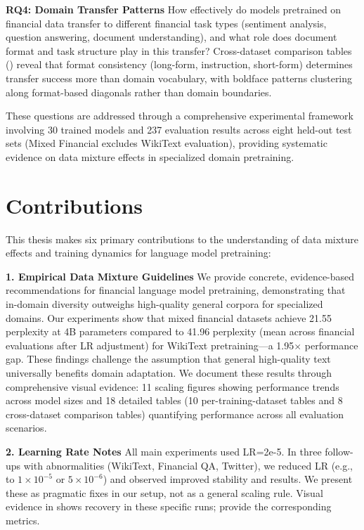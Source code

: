 \textbf{RQ4: Domain Transfer Patterns}
How effectively do models pretrained on financial data transfer to different financial task types (sentiment analysis, question answering, document understanding), and what role does document format and task structure play in this transfer? Cross-dataset comparison tables () reveal that format consistency (long-form, instruction, short-form) determines transfer success more than domain vocabulary, with boldface patterns clustering along format-based diagonals rather than domain boundaries.

These questions are addressed through a comprehensive experimental framework involving 30 trained models and 237 evaluation results across eight held-out test sets (Mixed Financial excludes WikiText evaluation), providing systematic evidence on data mixture effects in specialized domain pretraining.

\section{Contributions}

This thesis makes six primary contributions to the understanding of data mixture effects and training dynamics for language model pretraining:

\textbf{1. Empirical Data Mixture Guidelines}
We provide concrete, evidence-based recommendations for financial language model pretraining, demonstrating that in-domain diversity outweighs high-quality general corpora for specialized domains. Our experiments show that mixed financial datasets achieve 21.55 perplexity at 4B parameters compared to 41.96 perplexity (mean across financial evaluations after LR adjustment) for WikiText pretraining—a 1.95$\times$ performance gap. These findings challenge the assumption that general high-quality text universally benefits domain adaptation. We document these results through comprehensive visual evidence: 11 scaling figures showing performance trends across model sizes and 18 detailed tables (10 per-training-dataset tables and 8 cross-dataset comparison tables) quantifying performance across all evaluation scenarios.

\textbf{2. Learning Rate Notes}
All main experiments used LR=2e-5. In three follow-ups with abnormalities (WikiText, Financial QA, Twitter), we reduced LR (e.g., to $1\times10^{-5}$ or $5\times10^{-6}$) and observed improved stability and results. We present these as pragmatic fixes in our setup, not as a general scaling rule. Visual evidence in  shows recovery in these specific runs;  provide the corresponding metrics.

